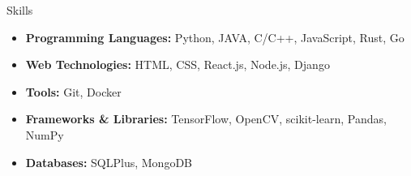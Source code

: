 \documentclass{resume} %
\begin{document}
\begin{rSection}{Skills}
\begin{itemize}
    \item {\bf Programming Languages:} Python, JAVA, C/C++, JavaScript, Rust, Go
    \item {\bf Web Technologies:} HTML, CSS, React.js, Node.js, Django
    \item {\bf Tools:} Git, Docker
    \item {\bf Frameworks \& Libraries:} TensorFlow, OpenCV, scikit-learn, Pandas, NumPy
    \item {\bf Databases:} SQLPlus, MongoDB
\end{itemize}
\end{rSection}
\end{document}
